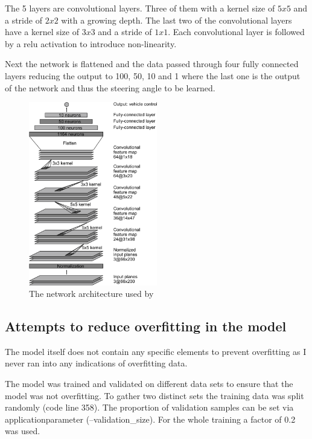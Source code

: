 \documentclass[a4paper, 11pt, DIV=14]{scrartcl}
\begin{document}
The 5 layers are convolutional layers. Three of them with a kernel size of $5x5$ and a stride of $2x2$ with a growing depth. The last two of the convolutional layers have a kernel size of $3x3$ and a stride of $1x1$. Each convolutional layer is followed by a relu activation to introduce non-linearity.

Next the network is flattened and the data passed through four fully connected layers reducing the output to 100, 50, 10 and 1 where the last one is the output of the network and thus the steering angle to be learned.

\begin{figure}
  \centering
    \includegraphics[width=0.5\textwidth]{images/cnn-architecture.png}
    \caption{The network architecture used by \parencite{NVidia}}
    \label{fig:network}
\end{figure}

\subsection{Attempts to reduce overfitting in the model}

The model itself does not contain any specific elements to prevent overfitting as I never ran into any indications of overfitting data.

The model was trained and validated on different data sets to ensure that the model was not overfitting. To gather two distinct sets the training data was split randomly (code line 358). The proportion of validation samples can be set via applicationparameter (--validation_size). For the whole training a factor of 0.2 was used. 
\end{document}
